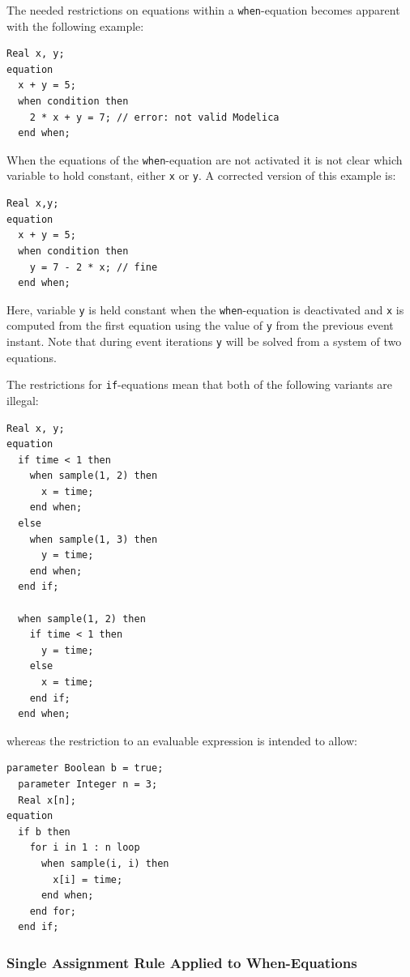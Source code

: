 \begin{nonnormative}
The needed restrictions on equations within a \lstinline!when!-equation becomes apparent with the following example:
\begin{lstlisting}[language=modelica]
  Real x, y;
equation
  x + y = 5;
  when condition then
    2 * x + y = 7; // error: not valid Modelica
  end when;
\end{lstlisting}

When the equations of the \lstinline!when!-equation are not activated it is not clear which variable to hold constant, either \lstinline!x! or \lstinline!y!.
A corrected version of this example is:
\begin{lstlisting}[language=modelica]
  Real x,y;
equation
  x + y = 5;
  when condition then
    y = 7 - 2 * x; // fine
  end when;
\end{lstlisting}
Here, variable \lstinline!y! is held constant when the \lstinline!when!-equation is deactivated and \lstinline!x! is computed from the first equation using the value of \lstinline!y! from the previous event instant.
Note that during event iterations \lstinline!y! will be solved from a system of two equations.
\end{nonnormative}

\begin{example}
The restrictions for \lstinline!if!-equations mean that both of the following variants are illegal:
\begin{lstlisting}[language=modelica]
  Real x, y;
equation
  if time < 1 then
    when sample(1, 2) then
      x = time;
    end when;
  else
    when sample(1, 3) then
      y = time;
    end when;
  end if;

  when sample(1, 2) then
    if time < 1 then
      y = time;
    else
      x = time;
    end if;
  end when;
\end{lstlisting}
whereas the restriction to an evaluable expression is intended to allow:
\begin{lstlisting}[language=modelica]
  parameter Boolean b = true;
  parameter Integer n = 3;
  Real x[n];
equation
  if b then
    for i in 1 : n loop
      when sample(i, i) then
        x[i] = time;
      end when;
    end for;
  end if;
\end{lstlisting}
\end{example}


\subsubsection{Single Assignment Rule Applied to When-Equations}\label{application-of-the-single-assignment-rule-to-when-equations}\label{single-assignment-rule-applied-to-when-equations}


